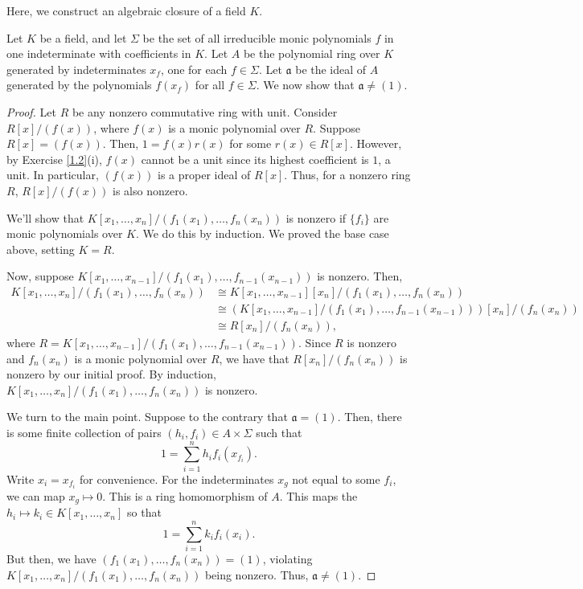 Here, we construct an algebraic closure of a field $K$.

Let $K$ be a field, and let $\Sigma$ be the set of all irreducible monic polynomials $f$ in one indeterminate with coefficients in $K$. Let 
$A$ be the polynomial ring over $K$ generated by indeterminates $x_f$, one for each $f \in \Sigma$. Let $\mathfrak{a}$ be the ideal of $A$
generated by the polynomials $f(x_f)$ for all $f \in \Sigma$. We now show that $\mathfrak{a} \neq (1)$.

\begin{proof}
Let $R$ be any nonzero commutative ring with unit. Consider $R[x]/(f(x))$, where $f(x)$ is a monic polynomial over $R$. Suppose
$R[x] = (f(x))$. Then, $1 = f(x)r(x)$ for some $r(x) \in R[x]$. However, by Exercise \ref{1.2}(i), $f(x)$ cannot be a unit
since its highest coefficient is $1$, a unit. In particular, $(f(x))$ is a proper ideal of $R[x]$. Thus, for a nonzero ring $R$,
$R[x]/(f(x))$ is also nonzero.

We'll show that $K[x_1,\ldots,x_n] / (f_1(x_1), \ldots, f_n(x_n))$ is nonzero if $\{f_i\}$ are monic polynomials over $K$. We
do this by induction. We proved the base case above, setting $K = R$.

Now, suppose $K[x_1,\ldots,x_{n-1}] / (f_1(x_1), \ldots, f_{n-1}(x_{n-1}))$ is nonzero. Then,
\begin{align*}
K[x_1,\ldots,x_n]/(f_1(x_1), \ldots, f_n(x_n)) &\cong K[x_1,\ldots,x_{n-1}][x_n]/(f_1(x_1), \ldots, f_n(x_n)) \\
&\cong \left(K[x_1,\ldots,x_{n-1}]/(f_1(x_1),\ldots,f_{n-1}(x_{n-1}))\right)[x_n]/(f_n(x_n)) \\
&\cong R[x_n]/(f_n(x_n)),
\end{align*}
where $R = K[x_1,\ldots,x_{n-1}]/(f_1(x_1),\ldots,f_{n-1}(x_{n-1}))$. Since $R$ is nonzero and $f_n(x_n)$ is a monic polynomial over $R$,
we have that $R[x_n]/(f_n(x_n))$ is nonzero by our initial proof. By induction, $K[x_1,\ldots,x_n] / (f_1(x_1), \ldots, f_n(x_n))$ is nonzero.

We turn to the main point. Suppose to the contrary that $\mathfrak{a} = (1)$. Then, there is some finite collection of pairs $(h_i,f_i) \in A \times \Sigma$
such that
$$1 = \sum_{i=1}^n h_i f_i(x_{f_i}).$$
Write $x_i = x_{f_i}$ for convenience. For the indeterminates $x_g$ not equal to some $f_i$, we can map $x_g \mapsto 0$. This is a ring homomorphism of $A$. This
maps the $h_i \mapsto k_i \in K[x_1,\ldots,x_n]$ so that
$$1 = \sum_{i=1}^n k_i f_i(x_i).$$
But then, we have $(f_1(x_1),\ldots,f_n(x_n)) = (1)$, violating $K[x_1,\ldots,x_n]/(f_1(x_1),\ldots,f_n(x_n))$ being nonzero. Thus,
$\mathfrak{a} \neq (1)$. 
\end{proof}

